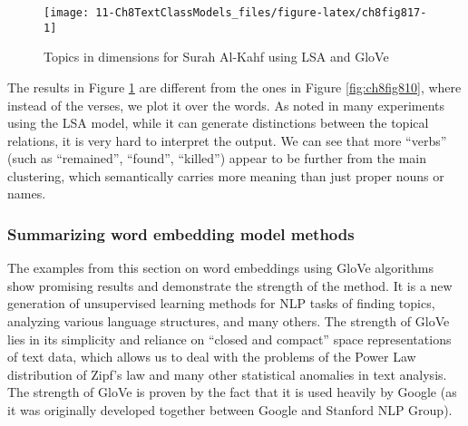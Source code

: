 \documentclass[
]{article}
\newenvironment{Shaded}{\begin{snugshade}}{\end{snugshade}}
\newcommand{\AttributeTok}[1]{\textcolor[rgb]{0.13,0.29,0.53}{#1}}
\newcommand{\DecValTok}[1]{\textcolor[rgb]{0.00,0.00,0.81}{#1}}
\newcommand{\FloatTok}[1]{\textcolor[rgb]{0.00,0.00,0.81}{#1}}
\newcommand{\FunctionTok}[1]{\textcolor[rgb]{0.13,0.29,0.53}{\textbf{#1}}}
\newcommand{\NormalTok}[1]{#1}
\newcommand{\OtherTok}[1]{\textcolor[rgb]{0.56,0.35,0.01}{#1}}
\newcommand{\SpecialCharTok}[1]{\textcolor[rgb]{0.81,0.36,0.00}{\textbf{#1}}}
\begin{document}
\begin{Shaded}
\end{Shaded}

\begin{figure}

{\centering \texttt{[image: 11-Ch8TextClassModels\_files/figure-latex/ch8fig817-1]} 

}

\caption{Topics in dimensions for Surah Al-Kahf using LSA and GloVe}\label{fig:ch8fig817}
\end{figure}

The results in Figure \ref{fig:ch8fig817} are different from the ones in Figure \ref{fig:ch8fig810}, where instead of the verses, we plot it over the words. As noted in many experiments using the LSA model, while it can generate distinctions between the topical relations, it is very hard to interpret the output. We can see that more ``verbs'' (such as ``remained'', ``found'', ``killed'') appear to be further from the main clustering, which semantically carries more meaning than just proper nouns or names.

\hypertarget{summarizing-word-embedding-model-methods}{%
\subsubsection{Summarizing word embedding model methods}\label{summarizing-word-embedding-model-methods}}

The examples from this section on word embeddings using GloVe algorithms show promising results and demonstrate the strength of the method. It is a new generation of unsupervised learning methods for NLP tasks of finding topics, analyzing various language structures, and many others. The strength of GloVe lies in its simplicity and reliance on ``closed and compact'' space representations of text data, which allows us to deal with the problems of the Power Law distribution of Zipf's law and many other statistical anomalies in text analysis. The strength of GloVe is proven by the fact that it is used heavily by Google (as it was originally developed together between Google and Stanford NLP Group).
\end{document}
